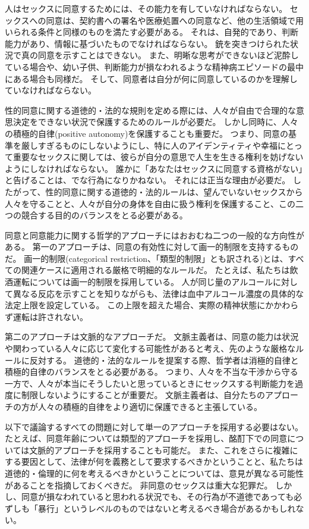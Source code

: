 \documentclass[paper=a4,book,openany]{jlreq}
\begin{document}
人はセックスに同意するためには、その能力を有していなければならない。
セックスへの同意は、契約書への署名や医療処置への同意など、他の生活領域で用いられる条件と同様のものを満たす必要がある。
それは、自発的であり、判断能力があり、情報に基づいたものでなければならない。
銃を突きつけられた状況で真の同意を示すことはできない。
また、明晰な思考ができないほど泥酔している場合や、幼い子供、判断能力が損なわれるような精神病エピソードの最中にある場合も同様だ。
そして、同意者は自分が何に同意しているのかを理解していなければならない。

性的同意に関する道徳的・法的な規則を定める際には、人々が自由で合理的な意思決定をできない状況で保護するためのルールが必要だ。
しかし同時に、人々の積極的自律(positive autonomy)を保護することも重要だ。
つまり、同意の基準を厳しすぎるものにしないようにし、特に人のアイデンティティや幸福にとって重要なセックスに関しては、彼らが自分の意思で人生を生きる権利を妨げないようにしなければならない。
誰かに「あなたはセックスに同意する資格がない」と告げることは、でな行為になりかねない。
それには正当な理由が必要だ。
したがって、性的同意に関する道徳的・法的ルールは、望んでいないセックスから人々を守ることと、人々が自分の身体を自由に扱う権利を保護すること、この二つの競合する目的のバランスをとる必要がある。

同意と同意能力に関する哲学的アプローチにはおおむね二つの一般的な方向性がある。
第一のアプローチは、同意の有効性に対して画一的制限を支持するものだ。
画一的制限(categorical restriction、「類型的制限」とも訳される)とは、すべての関連ケースに適用される厳格で明細的なルールだ。
たとえば、私たちは飲酒運転については画一的制限を採用している。
人が同じ量のアルコールに対して異なる反応を示すことを知りながらも、法律は血中アルコール濃度の具体的な法定上限を設定している。
この上限を超えた場合、実際の精神状態にかかわらず運転は許されない。

第二のアプローチは文脈的なアプローチだ。
文脈主義者は、同意の能力は状況や関わっている人々に応じて変化する可能性があると考え、先のような厳格なルールに反対する。
道徳的・法的なルールを提案する際、哲学者は消極的自律と積極的自律のバランスをとる必要がある。
つまり、人々を不当な干渉から守る一方で、人々が本当にそうしたいと思っているときにセックスする判断能力を過度に制限しないようにすることが重要だ。
文脈主義者は、自分たちのアプローチの方が人々の積極的自律をより適切に保護できると主張している。

以下で議論するすべての問題に対して単一のアプローチを採用する必要はない。
たとえば、同意年齢については類型的アプローチを採用し、酩酊下での同意については文脈的アプローチを採用することも可能だ。
また、これをさらに複雑にする要因として、法律が何を義務として要求するべきかということと、私たちは道徳的・倫理的に何を考えるべきかということについては、意見が異なる可能性があることを指摘しておくべきだ。
非同意のセックスは重大な犯罪だ。
しかし、同意が損なわれていると思われる状況でも、その行為が不道徳であっても必ずしも「暴行」というレベルのものではないと考えるべき場合があるかもしれない。
\end{document}
